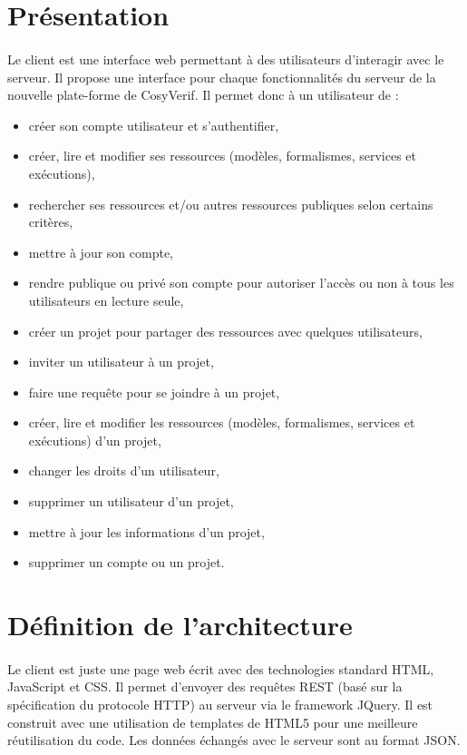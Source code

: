 \documentclass{report}
\begin{document}
\section{Présentation}

\paragraph{}
Le client est une interface web permettant à des utilisateurs d'interagir avec le serveur. Il propose une interface pour chaque 
fonctionnalités du serveur de la nouvelle plate-forme de CosyVerif. Il permet donc à un utilisateur de :

\begin{itemize}
\item créer son compte utilisateur et s'authentifier,
\item créer, lire et modifier ses ressources (modèles, formalismes, services et exécutions),
\item rechercher ses ressources et/ou autres ressources publiques selon certains critères,
\item mettre à jour son compte,
\item rendre publique ou privé son compte pour autoriser l'accès ou non à tous les utilisateurs en lecture seule,
\item créer un projet pour partager des ressources avec quelques utilisateurs,
\item inviter un utilisateur à un projet,
\item faire une requête pour se joindre à un projet,
\item créer, lire et modifier les ressources (modèles, formalismes, services et exécutions) d'un projet,
\item changer les droits d'un utilisateur,
\item supprimer un utilisateur d'un projet,
\item mettre à jour les informations d'un projet,
\item supprimer un compte ou un projet.
\end{itemize}

\section{Définition de l'architecture}

\paragraph{}
Le client est juste une page web écrit avec des technologies standard HTML, JavaScript et CSS. Il permet d'envoyer des 
requêtes REST (basé sur la spécification du protocole HTTP) au serveur via le framework JQuery. Il est construit avec une
utilisation de templates de HTML5 pour une meilleure réutilisation du code. Les données échangés avec le serveur sont
au format JSON.
\end{document}

